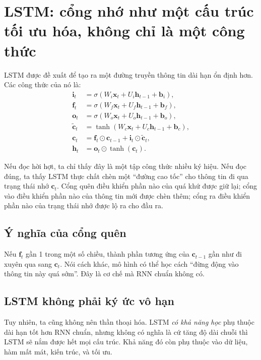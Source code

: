 \section{LSTM: cổng nhớ như một cấu trúc tối ưu hóa, không chỉ là một công thức}

LSTM được đề xuất để tạo ra một đường truyền thông tin dài hạn ổn định hơn. Các công thức của nó là:
\begin{align*}
\bm{i}_t &= \sigma(W_i \bm{x}_t + U_i \bm{h}_{t-1} + \bm{b}_i),\\
\bm{f}_t &= \sigma(W_f \bm{x}_t + U_f \bm{h}_{t-1} + \bm{b}_f),\\
\bm{o}_t &= \sigma(W_o \bm{x}_t + U_o \bm{h}_{t-1} + \bm{b}_o),\\
\tilde{\bm{c}}_t &= \tanh(W_c \bm{x}_t + U_c \bm{h}_{t-1} + \bm{b}_c),\\
\bm{c}_t &= \bm{f}_t\odot \bm{c}_{t-1} + \bm{i}_t\odot \tilde{\bm{c}}_t,\\
\bm{h}_t &= \bm{o}_t\odot \tanh(\bm{c}_t).
\end{align*}

Nếu đọc hời hợt, ta chỉ thấy đây là một tập công thức nhiều ký hiệu. Nếu đọc đúng, ta thấy LSTM thực chất chèn một ``đường cao tốc'' cho thông tin đi qua trạng thái nhớ \(\bm{c}_t\). Cổng quên điều khiển phần nào của quá khứ được giữ lại; cổng vào điều khiển phần nào của thông tin mới được chèn thêm; cổng ra điều khiển phần nào của trạng thái nhớ được lộ ra cho đầu ra.

\subsection{Ý nghĩa của cổng quên}

Nếu \(\bm{f}_t\) gần 1 trong một số chiều, thành phần tương ứng của \(\bm{c}_{t-1}\) gần như đi xuyên qua sang \(\bm{c}_t\). Nói cách khác, mô hình có thể học cách ``đừng động vào thông tin này quá sớm''. Đây là cơ chế mà RNN chuẩn không có.

\subsection{LSTM không phải ký ức vô hạn}

Tuy nhiên, ta cũng không nên thần thoại hóa. LSTM \emph{có khả năng học} phụ thuộc dài hạn tốt hơn RNN chuẩn, nhưng không có nghĩa là cứ tăng độ dài chuỗi thì LSTM sẽ nắm được hết mọi cấu trúc. Khả năng đó còn phụ thuộc vào dữ liệu, hàm mất mát, kiến trúc, và tối ưu.

